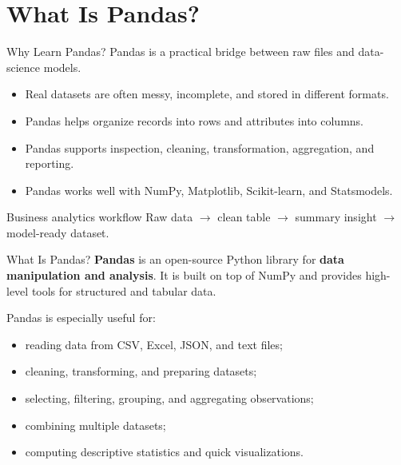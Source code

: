\documentclass[aspectratio=169,11pt]{beamer}
\newcommand{\key}[1]{\textbf{\textcolor{AccentGreen}{#1}}}
\begin{document}
\section{What Is Pandas?}

\begin{frame}{Why Learn Pandas?}
\small
Pandas is a practical bridge between raw files and data-science models.
\begin{itemize}
  \item Real datasets are often messy, incomplete, and stored in different formats.
  \item Pandas helps organize records into rows and attributes into columns.
  \item Pandas supports inspection, cleaning, transformation, aggregation, and reporting.
  \item Pandas works well with NumPy, Matplotlib, Scikit-learn, and Statsmodels.
\end{itemize}
\begin{block}{Business analytics workflow}
Raw data $\rightarrow$ clean table $\rightarrow$ summary insight $\rightarrow$ model-ready dataset.
\end{block}
\end{frame}

\begin{frame}{What Is Pandas?}
\small
\key{Pandas} is an open-source Python library for \key{data manipulation and analysis}.
It is built on top of NumPy and provides high-level tools for structured and tabular data.
\vspace{0.4em}

Pandas is especially useful for:
\begin{itemize}
  \item reading data from CSV, Excel, JSON, and text files;
  \item cleaning, transforming, and preparing datasets;
  \item selecting, filtering, grouping, and aggregating observations;
  \item combining multiple datasets;
  \item computing descriptive statistics and quick visualizations.
\end{itemize}
\end{frame}
\end{document}
